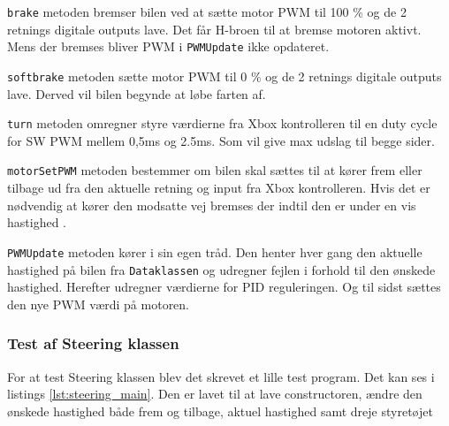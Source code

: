 \texttt{brake} metoden bremser bilen ved at sætte motor PWM til 100 \% og de 2 retnings digitale outputs lave. Det får H-broen til at bremse motoren aktivt. Mens der bremses bliver PWM i \texttt{PWMUpdate} ikke opdateret.


\texttt{softbrake} metoden sætte motor PWM til 0 \% og de 2 retnings digitale outputs lave. 
Derved vil bilen begynde at løbe farten af.


\texttt{turn} metoden omregner styre værdierne fra Xbox kontrolleren til en duty cycle for SW PWM mellem 0,5ms og 2.5ms. 
Som vil give max udslag til begge sider. 


\texttt{motorSetPWM} metoden bestemmer om bilen skal sættes til at kører frem eller tilbage ud fra den aktuelle retning og input fra Xbox kontrolleren. 
Hvis det er nødvendig at kører den modsatte vej bremses der indtil den er under en vis hastighed
. 


\texttt{PWMUpdate} metoden kører i sin egen tråd. Den henter hver gang den aktuelle hastighed på bilen fra \texttt{Dataklassen} og udregner fejlen i forhold til den ønskede hastighed. Herefter udregner værdierne for PID reguleringen. Og til sidst sættes den nye PWM værdi på motoren. 


\subsubsection{Test af Steering klassen}

For at test Steering klassen blev det skrevet et lille test program. Det kan ses i listings \ref{lst:steering_main}. Den er lavet til at lave constructoren, ændre den ønskede hastighed både frem og tilbage, aktuel hastighed samt dreje styretøjet


